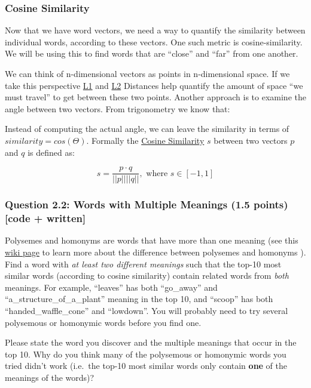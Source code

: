 \documentclass[11pt]{article}
\begin{document}
    \subsubsection{Cosine Similarity}\label{cosine-similarity}

Now that we have word vectors, we need a way to quantify the similarity
between individual words, according to these vectors. One such metric is
cosine-similarity. We will be using this to find words that are
``close'' and ``far'' from one another.

We can think of n-dimensional vectors as points in n-dimensional space.
If we take this perspective
\href{http://mathworld.wolfram.com/L1-Norm.html}{L1} and
\href{http://mathworld.wolfram.com/L2-Norm.html}{L2} Distances help
quantify the amount of space ``we must travel'' to get between these two
points. Another approach is to examine the angle between two vectors.
From trigonometry we know that:

Instead of computing the actual angle, we can leave the similarity in
terms of \(similarity = cos(\Theta)\). Formally the
\href{https://en.wikipedia.org/wiki/Cosine_similarity}{Cosine
Similarity} \(s\) between two vectors \(p\) and \(q\) is defined as:

\[s = \frac{p \cdot q}{||p|| ||q||}, \textrm{ where } s \in [-1, 1] \]

    \subsubsection{Question 2.2: Words with Multiple Meanings (1.5 points)
{[}code +
written{]}}\label{question-2.2-words-with-multiple-meanings-1.5-points-code-written}

Polysemes and homonyms are words that have more than one meaning (see
this \href{https://en.wikipedia.org/wiki/Polysemy}{wiki page} to learn
more about the difference between polysemes and homonyms ). Find a word
with \emph{at least two different meanings} such that the top-10 most
similar words (according to cosine similarity) contain related words
from \emph{both} meanings. For example, ``leaves'' has both ``go\_away''
and ``a\_structure\_of\_a\_plant'' meaning in the top 10, and ``scoop''
has both ``handed\_waffle\_cone'' and ``lowdown''. You will probably
need to try several polysemous or homonymic words before you find one.

Please state the word you discover and the multiple meanings that occur
in the top 10. Why do you think many of the polysemous or homonymic
words you tried didn't work (i.e.~the top-10 most similar words only
contain \textbf{one} of the meanings of the words)?
\end{document}
